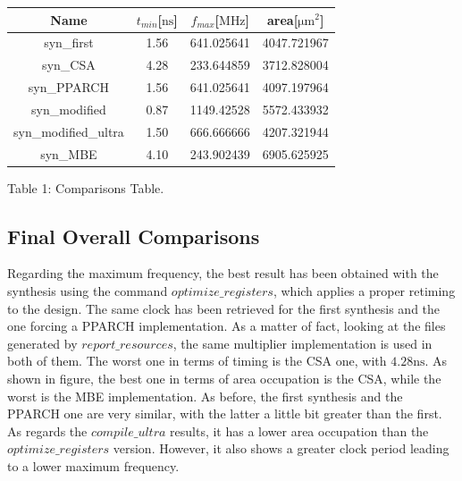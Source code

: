 \begin{center}
    \begin{tabular}{ |c|c|c|c| } 
        \hline
            Name & $t_{min}$[$\si{\nano\second}$] & $f_{max}$[$\si{\mega\hertz}$] & area[$\si{\micro\meter}^{2}$]\\
            \hline
            syn\_first & 1.56 & 641.025641 & 4047.721967\\
            \hline
            syn\_CSA & 4.28 & 233.644859 & 3712.828004\\
            \hline
            syn\_PPARCH & 1.56 & 641.025641 & 4097.197964\\
            \hline
            syn\_modified & 0.87 & 1149.42528 & 5572.433932\\
            \hline
            syn\_modified\_ultra & 1.50 & 666.666666 & 4207.321944\\
            \hline
            syn\_MBE & 4.10 & 243.902439 & 6905.625925\\
        	\hline
    \end{tabular}
    \begin{center}
    	Table 1: Comparisons Table.
    \end{center}
\end{center}


\subsection{Final Overall Comparisons}

Regarding the maximum frequency, the best result has been obtained with the synthesis using the command $optimize\_registers$, which applies a proper retiming to the design. The same clock has been retrieved for the first synthesis and the one forcing a PPARCH implementation. As a matter of fact, looking at the files generated by $report\_resources$, the same multiplier implementation is used in both of them. The worst one in terms of timing is the CSA one, with $4.28\si{\nano\second}$.
As shown in figure, the best one in terms of area occupation is the CSA, while the worst is the MBE implementation. As before, the first synthesis and the PPARCH one are very similar, with the latter a little bit greater than the first. As regards the $compile\_ultra$ results, it has a lower area occupation than the $optimize\_registers$ version. However, it also shows a greater clock period leading to a lower maximum frequency.